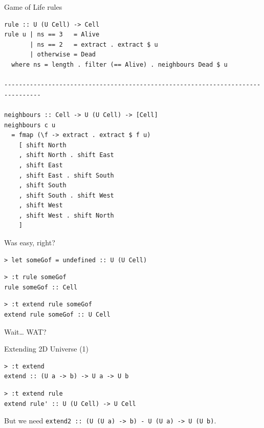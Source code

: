 \documentclass[presentation,aspectratio=169,smaller]{beamer}
\begin{document}
\begin{frame}[label={sec:org752f951},fragile]{Game of Life rules}
 \begin{verbatim}
rule :: U (U Cell) -> Cell
rule u | ns == 3   = Alive
       | ns == 2   = extract . extract $ u
       | otherwise = Dead
  where ns = length . filter (== Alive) . neighbours Dead $ u

--------------------------------------------------------------------------------

neighbours :: Cell -> U (U Cell) -> [Cell]
neighbours c u
  = fmap (\f -> extract . extract $ f u)
    [ shift North
    , shift North . shift East
    , shift East
    , shift East . shift South
    , shift South
    , shift South . shift West
    , shift West
    , shift West . shift North
    ]
\end{verbatim}
\end{frame}

\begin{frame}[label={sec:orgaf6b13c},fragile]{Was easy, right?}
 \begin{verbatim}
> let someGof = undefined :: U (U Cell)
\end{verbatim}

\pause

\begin{verbatim}
> :t rule someGof
rule someGof :: Cell
\end{verbatim}

\pause

\begin{verbatim}
> :t extend rule someGof
extend rule someGof :: U Cell
\end{verbatim}

\pause

Wait\ldots{} WAT?
\end{frame}

\begin{frame}[label={sec:orgfd33c34},fragile]{Extending 2D Universe (1)}
 \begin{verbatim}
> :t extend
extend :: (U a -> b) -> U a -> U b
\end{verbatim}

\pause

\begin{verbatim}
> :t extend rule
extend rule' :: U (U Cell) -> U Cell
\end{verbatim}

\pause

But we need \texttt{extend2 :: (U (U a) -> b) - U (U a) -> U (U b)}.
\end{frame}
\end{document}
